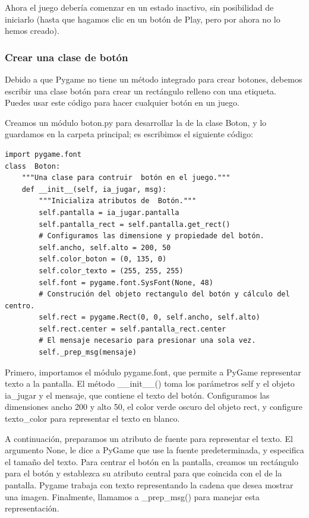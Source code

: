 Ahora el juego debería comenzar en un estado inactivo, sin posibilidad de iniciarlo (hasta que hagamos clic en un botón de Play, pero por ahora no lo hemos creado).

\subsubsection{Crear una clase de botón}

Debido a que Pygame no tiene un método integrado para crear botones, debemos escribir una clase botón para crear un rectángulo relleno con una etiqueta. Puedes usar este código para hacer cualquier botón en un juego.

Creamos un módulo {\ttfamily boton.py}  para desarrollar la de la clase {\ttfamily Boton},  y lo guardamos en la carpeta principal; es escribimos el siguiente código:

\hspace{-2.5cm}{\ttfamily \scriptsize boton.py}  \vspace{-0.5cm}
\begin{lstlisting}
import pygame.font
class  Boton:
    """Una clase para contruir  botón en el juego."""
    def __init__(self, ia_jugar, msg):
        """Inicializa atributos de  Botón."""
        self.pantalla = ia_jugar.pantalla
        self.pantalla_rect = self.pantalla.get_rect()
        # Configuramos las dimensione y propiedade del botón.
        self.ancho, self.alto = 200, 50
        self.color_boton = (0, 135, 0)
        self.color_texto = (255, 255, 255)
        self.font = pygame.font.SysFont(None, 48)
        # Construción del objeto rectangulo del botón y cálculo del centro.
        self.rect = pygame.Rect(0, 0, self.ancho, self.alto)
        self.rect.center = self.pantalla_rect.center
        # El mensaje necesario para presionar una sola vez.
        self._prep_msg(mensaje)
\end{lstlisting} 
Primero, importamos el módulo  {\ttfamily pygame.font}, que permite a PyGame representar texto 
a la pantalla. El método  {\ttfamily \_\_init\_\_()} toma los parámetros  {\ttfamily self} y el objeto {\ttfamily  ia\_jugar}
y el {\ttfamily mensaje}, que contiene el texto del botón. Configuramos las dimensiones ancho 200 y alto 50, el color  verde oscuro del objeto {\ttfamily rect}, y configure {\ttfamily texto\_color} para representar el texto en blanco.


A continuación, preparamos un atributo de fuente para representar el texto. El argumento {\ttfamily None}, 
le dice a PyGame que use la fuente predeterminada, y {} especifica el tamaño del texto. Para centrar el botón en la pantalla, creamos un rectángulo para el botón y establezca su atributo central para que coincida con el de la pantalla.
Pygame trabaja con texto representando la cadena que desea mostrar una imagen. Finalmente, llamamos a {\ttfamily \_prep\_msg()} para manejar esta representación.

